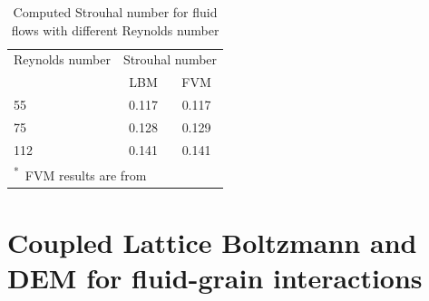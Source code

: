 \begin{table}[tbhp]
	\caption{Computed Strouhal number for fluid flows with different Reynolds 
	number}
	\label{table:strouhal}
	\centering

	\begin{tabular}{l c c}
		\toprule
		Reynolds number & \multicolumn{2}{c}{Strouhal number} \\
		\cmidrule{2-3}
		& LBM & FVM \\
		\midrule
		55		& 0.117	 &	0.117 \\
		75		& 0.128	 &	0.129 \\
		112		& 0.141  &	0.141 \\
		\bottomrule
		\multicolumn{3}{l}{\footnotesize{\textsuperscript{*}~FVM results are 
		from~\citet{Breuer2000}}}
	\end{tabular}
\end{table}




\section[Coupled LBM -- DEM for fluid--grain interactions]{Coupled Lattice 
Boltzmann and DEM for fluid-grain interactions}


